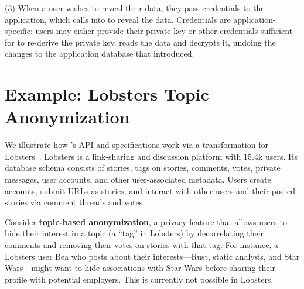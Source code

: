 %
(3) When a user wishes to reveal their \xxed data, they pass credentials
to the application, which calls into \sys to reveal the data.
%
Credentials are application-specific: users may either provide their private
key or other credentials sufficient for \sys to re-derive the private key.
%
\sys reads the \xxed data and decrypts it, undoing the changes to the
application database that \xxing introduced.
%

%

\section{Example: Lobsters Topic Anonymization}
\label{s:design:lobsters}

We illustrate how \sys's API and \xx specifications work via a \xxing
transformation for Lobsters~\cite{lobsters}.  Lobsters is a
link-sharing and discussion platform with 15.4k
users.
%
Its database schema consists of stories, tags on stories, comments, votes,
private messages, user accounts, and other user-associated metadata.
%
Users create accounts, submit URLs as stories, and interact with other users
and their posted stories via comment threads and votes.
%

Consider \textbf{topic-based anonymization}, a privacy feature that allows users to
hide their interest in a topic (a ``tag'' in Lobsters) by decorrelating
their comments and removing their votes on stories with that tag.
%
For instance, a Lobsters user Bea who posts about their interests---Rust,
static analysis, and Star Wars---might want to hide associations with
Star Wars before sharing their profile with potential employers.
%
This is currently not possible in Lobsters.

